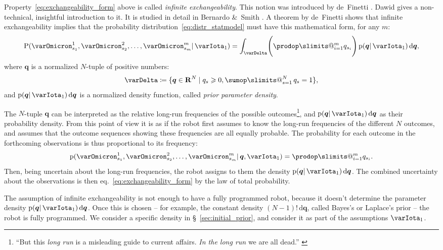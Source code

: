 \documentclass[\ifafour a4paper,12pt,\else a5paper,10pt,\fi%
onecolumn,oneside,article,%
british%
]{memoir}
\makeatletter
\theoremstyle{remark}
\theoremstyle{innote}
\def\sum{\DOTSI\sumop\slimits@}
\def\prod{\DOTSI\prodop\slimits@}
\let\parentext=\parentexttrack%
\newcommand*{\citep}{\parencites}
\newcommand*{\citey}{\parencites*}
\newcommand*{\amp}{\&}
\newcommand*{\di}{\mathrm{d}}%
\newcommand*{\RR}{\bm{\mathrm{R}}}
\newcommand*{\defd}{\coloneqq}
\newcommand*{\suchthat}{\mid}%
\renewcommand{\ge}{\geqslant}%
\DeclarePairedDelimiter\set{\{}{\}}
\newcommand*{\pf}{\mathrm{p}}%
\newcommand*{\p}{\mathrm{P}}%
\renewcommand*{\|}{\mathpunct{|}}
\newcommand*{\sect}{\S}%
\newcommand*{\eqn}{eq.}%
\newcommand*{\tsum}{\mathop{\textstyle\sum}\nolimits}
\newcommand*{\simpl}{\varDelta}
\newcommand*{\yqq}{q}
\newcommand*{\yq}{\bm{\yqq}}
\newcommand*{\yI}{\varIota}
\newcommand*{\yO}{\varOmicron}
\newcommand*{\yMJ}{\yI_1}
\makeatother
\begin{document}
Property~\eqref{eq:exchangeability_form} above is called \emph{infinite
  exchangeability}. This notion was introduced by de~Finetti
\parentext{\cite*{definetti1930,definetti1937}; \cite{heathetal1976}}.
Dawid \citey{dawid2013} gives a non-technical, insightful introduction to
it. It is studied in detail in Bernardo \amp\ Smith
\citey[\sect~4.2]{bernardoetal1994_r2000}. A theorem by de~Finetti shows
that infinite exchangeability implies that the probability
distribution~\eqref{eq:distr_statmodel} must have this mathematical form,
for any $m$:
\begin{equation}
  \label{eq:exchangeability_form}
  \p(\yO^1_{s_1} , \yO^2_{s_2} , \dotsc , \yO^m_{s_m} \| \yMJ) =
  \int_\simpl   \Biggl( \prod_{i=1}^m \yqq_{s_i} \Biggr)\, \pf(\yq \| \yMJ)\,\di\yq,
\end{equation}
where $\yq$ is a normalized $N$-tuple of positive numbers:
\begin{equation}
\simpl \defd \set{\yq \in \RR^N \suchthat \yqq_s\ge0,
  \tsum_{s=1}^N\yqq_s=1},
\label{eq:simplex}
\end{equation}
and $\pf(\yq \| \yMJ)\,\di\yq$ is a normalized density function, called
\emph{prior parameter density}.

The $N$-tuple $\yq$ can be interpreted as the relative long-run frequencies
of the possible outcomes\footnote{\enquote{But this \emph{long run} is a
    misleading guide to current affairs. \emph{In the long run} we are all
    dead.} \citep[\sect~3.I, p.~65]{keynes1923_r2013}}, and
$\pf(\yq \| \yMJ)\,\di\yq$ as their probability density. From this point of
view it is as if the robot first assumes to know the long-run frequencies
of the different $N$ outcomes, and assumes that the outcome sequences
showing these frequencies are all equally probable. The probability for
each outcome in the forthcoming observations is thus proportional to its
frequency:
\begin{equation}
  \label{eq:param_conditional_definetti}
  \pf(\yO^1_{s_1} , \yO^2_{s_2} , \dotsc , \yO^m_{s_m}  \| \yq,\yMJ)
  = \prod_{i=1}^m \yqq_{s_i}.
\end{equation}
Then, being uncertain about the long-run frequencies, the robot assigns to
them the density $\pf(\yq \| \yMJ)\,\di\yq$. The combined uncertainty about
the observations is then \eqn~\eqref{eq:exchangeability_form} by the law of
total probability.

\medskip

The assumption of infinite exchangeability is not enough to have a fully
programmed robot, because it doesn't determine the parameter density
$\pf(\yq \| \yMJ)\,\di\yq$. Once this is chosen -- for example, the
constant density $(N-1)!\,\di\yq$, called Bayes's
\citey[Scholium]{bayes1763} or Laplace's \citey[p.~xvii]{laplace1814_r1819}
prior -- the robot is fully programmed. We consider a specific density in
\sect~\ref{sec:initial_prior}, and consider it as part of the assumptions
$\yMJ$.
\end{document}

